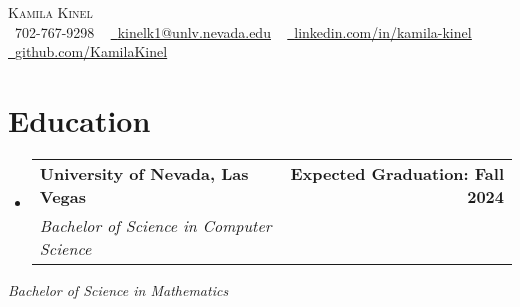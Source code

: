 \documentclass[letterpaper,11pt]{article}
\makeatletter
\newcommand{\resumeSubheading}[4]{
  \vspace{-2pt}\item
    \begin{tabular*}{1.0\textwidth}[t]{l@{\extracolsep{\fill}}r}
      \textbf{#1} & \textbf{\small #2} \\
      \textit{\small#3} & \textit{\small #4} \\
    \end{tabular*}\vspace{-7pt}
}
\newcommand{\resumeSubHeadingListStart}{\begin{itemize}[leftmargin=0.0in, label={}]}
\newcommand{\resumeSubHeadingListEnd}{\end{itemize}}
\makeatother
\begin{document}

\begin{center}
    {\Huge \scshape Kamila Kinel} \\ \vspace{1pt}
    \vspace{5pt}
    \small \raisebox{-0.1\height}\faPhone\ 702-767-9298 ~ \href{mailto:x@gmail.com}{\raisebox{-0.2\height}\faEnvelope\  \underline{kinelk1@unlv.nevada.edu}} ~ 
    \href{https://linkedin.com/in//}{\raisebox{-0.2\height}\faLinkedin\ \underline{linkedin.com/in/kamila-kinel}}  ~
    \href{https://github.com/}{\raisebox{-0.2\height}\faGithub\ \underline{github.com/KamilaKinel}}
    \vspace{-8pt}
\end{center}


\section{Education}
  \resumeSubHeadingListStart
    \resumeSubheading
      {University of Nevada, Las Vegas}{Expected Graduation: Fall 2024}
      {Bachelor of Science in Computer Science}{}
  \resumeSubHeadingListEnd
      \vspace{0.5pt}
      \emph{Bachelor of Science in Mathematics}
\end{document}
